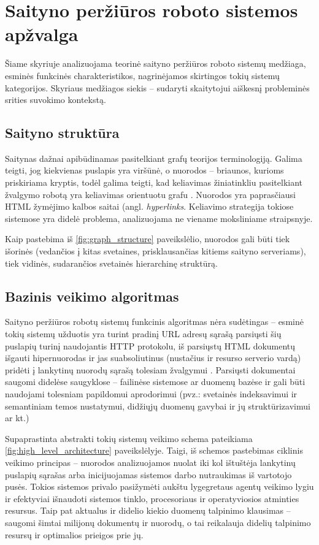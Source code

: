 \section{Saityno peržiūros roboto sistemos apžvalga}

Šiame skyriuje analizuojama teorinė saityno peržiūros roboto sistemų medžiaga, esminės funkcinės charakteristikos, nagrinėjamos skirtingos tokių sistemų kategorijos. Skyriaus medžiagos siekis -- sudaryti skaitytojui aiškesnį probleminės srities suvokimo kontekstą.

\subsection{Saityno struktūra}

Saitynas dažnai apibūdinamas pasitelkiant grafų teorijos terminologiją. Galima teigti, jog kiekvienas puslapis yra viršūnė, o nuorodos -- briaunos, kurioms priskiriama kryptis, todėl galima teigti, kad keliavimas žiniatinkliu pasitelkiant žvalgymo robotą yra keliavimas orientuotu grafu \cite{CategoriesOfWebCrawlersAndOverview}. Nuorodos yra paprasčiausi HTML žymėjimo kalbos saitai (angl. \textit{hyperlinks}. Keliavimo strategija tokiose sistemose yra didelė problema, analizuojama ne viename moksliniame straipsnyje.

Kaip pastebima iš \ref{fig:graph_structure} paveikslėlio, nuorodos gali būti tiek išorinės (vedančios į kitas svetaines, prisklausančias kitiems saityno serveriams), tiek vidinės, sudarančios svetainės hierarchinę struktūrą.

\subsection{Bazinis veikimo algoritmas}

Saityno peržiūros robotų sistemų funkcinis algoritmas nėra sudėtingas -- esminė tokių sistemų užduotis yra turint pradinį URL adresų sąrašą parsiųsti šių puslapių turinį naudojantis HTTP protokolu, iš parsiųstų HTML dokumentų išgauti hipernuorodas ir jas suabsoliutinus (nustačius ir resurso serverio vardą) pridėti į lankytinų nuorodų sąrašą tolesiam žvalgymui \cite{StanfWebCrawl}. Parsiųsti dokumentai saugomi didelėse saugyklose -- failinėse sistemose ar duomenų bazėse ir gali būti naudojami tolesniam papildomui aprodorimui (pvz.: svetainės indeksavimui ir semantiniam temos nustatymui, didžiųjų duomenų gavybai ir jų struktūrizavimui ar kt.)


Supaprastinta abstrakti tokių sistemų veikimo schema pateikiama \ref{fig:high_level_architecture} paveikslėlyje. Taigi, iš schemos pastebimas ciklinis veikimo principas -- nuorodos analizuojamos nuolat iki kol ištuštėja lankytinų puslapių sąrašas arba inicijuojamas sistemos darbo nutraukimas iš vartotojo pusės. Tokios sistemos privalo pasižymėti aukštu lygegretaus agentų veikimo lygiu ir efektyviai išnaudoti sistemos tinklo, procesoriaus ir operatyviosios atminties resursus. Taip pat aktualus ir didelio kiekio duomenų talpinimo klausimas -- saugomi šimtai milijonų dokumentų ir nuorodų, o tai reikalauja didelių talpinimo resursų ir optimalios prieigos prie jų.

